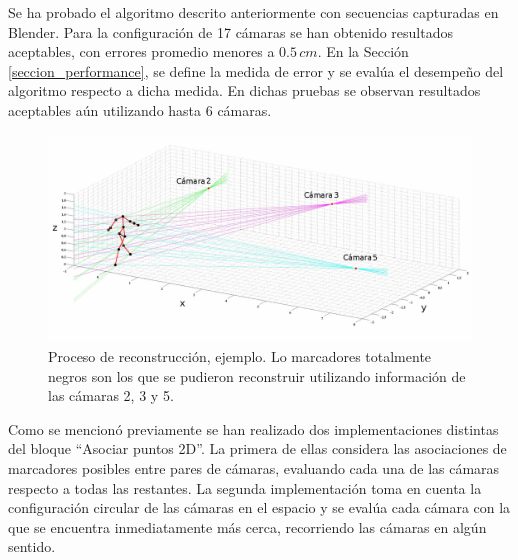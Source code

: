Se ha probado el algoritmo descrito anteriormente con secuencias capturadas en Blender. Para la configuración de 17 cámaras se han obtenido resultados aceptables,  con errores promedio menores a $0.5\,cm$. En la Sección \ref{seccion_performance}, se define la medida de error  y se evalúa el desempeño del algoritmo respecto a dicha medida. En dichas pruebas se observan resultados aceptables aún utilizando hasta 6 cámaras.

\begin{figure}[ht!]
\centering
\captionsetup{justification=centering,margin=0.8cm}
\includegraphics[scale=0.5]{img/Reconstruccion/Reconstruccion_3_camaras2.jpg}
\caption{Proceso de reconstrucción, ejemplo. Lo marcadores totalmente negros son los que se pudieron reconstruir utilizando información de las cámaras 2, 3 y 5.}
\end{figure}


Como se mencionó previamente se han realizado dos implementaciones distintas del bloque  “Asociar puntos 2D”. La primera de ellas considera las asociaciones de marcadores posibles entre pares de cámaras, evaluando cada una de las cámaras respecto a todas las restantes.  La segunda implementación toma en cuenta  la configuración circular de las cámaras en el espacio y se evalúa cada cámara con la que se encuentra inmediatamente más cerca,  recorriendo las cámaras en algún sentido.

